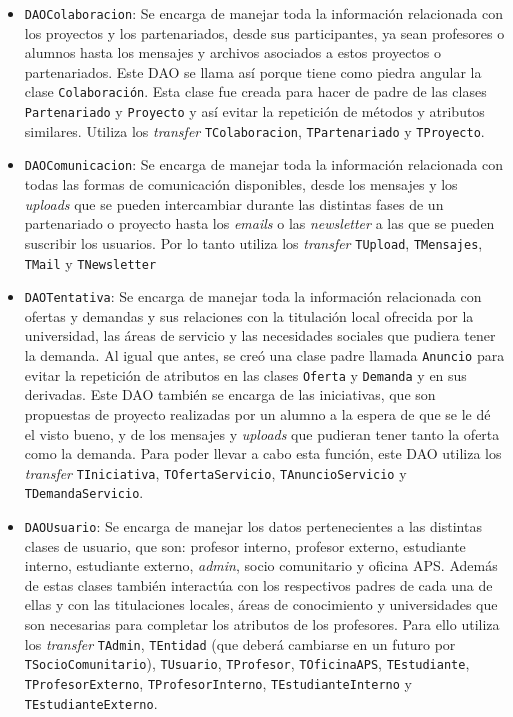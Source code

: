 \documentclass[11pt]{book}
\begin{document}
\begin{itemize}
	\item \texttt{DAOColaboracion}: Se encarga de manejar toda la información relacionada con los proyectos y los partenariados, desde sus participantes, ya sean profesores o alumnos hasta los mensajes y archivos asociados a estos proyectos o partenariados. Este DAO se llama así porque tiene como piedra angular la clase \texttt{Colaboración}.
	Esta clase fue creada para hacer de padre de las clases \texttt{Partenariado} y \texttt{Proyecto} y así evitar la repetición de métodos y atributos similares. Utiliza los \emph{transfer} \texttt{TColaboracion}, \texttt{TPartenariado} y \texttt{TProyecto}.

	\item \texttt{DAOComunicacion}: Se encarga de manejar toda la información relacionada con todas las formas de comunicación disponibles, desde los mensajes y los \emph{uploads} que se pueden intercambiar durante las distintas fases de un partenariado o proyecto hasta los \emph{emails} o las \emph{newsletter} a las que se pueden suscribir los usuarios. Por lo tanto utiliza los \emph{transfer} \texttt{TUpload}, \texttt{TMensajes}, \texttt{TMail} y \texttt{TNewsletter}

	\item \texttt{DAOTentativa}: Se encarga de manejar toda la información relacionada con ofertas y demandas y sus relaciones con la titulación local ofrecida por la universidad, las áreas de servicio y las necesidades sociales que pudiera tener la demanda. 
	Al igual que antes, se creó una clase padre llamada \texttt{Anuncio} para evitar la repetición de atributos en las clases \texttt{Oferta} y \texttt{Demanda} y en sus derivadas. Este DAO también se encarga de las iniciativas, que son propuestas de proyecto realizadas por un alumno a la espera de que se le dé el visto bueno, y de los mensajes y \emph{uploads} que pudieran tener tanto la oferta como la demanda. Para poder llevar a cabo esta función, este DAO utiliza los \emph{transfer} \texttt{TIniciativa}, \texttt{TOfertaServicio}, \texttt{TAnuncioServicio} y \texttt{TDemandaServicio}.

	\item \texttt{DAOUsuario}: Se encarga de manejar los datos pertenecientes a las distintas clases de usuario, que son: profesor interno, profesor externo, estudiante interno, estudiante externo, \emph{admin}, socio comunitario y oficina APS.
	Además de estas clases también interactúa con los respectivos padres de cada una de ellas y con las titulaciones locales, áreas de conocimiento y universidades que son necesarias para completar los atributos de los profesores.
	Para ello utiliza los \emph{transfer} \texttt{TAdmin}, \texttt{TEntidad} (que deberá cambiarse en un futuro por \texttt{TSocioComunitario}), \texttt{TUsuario}, \texttt{TProfesor}, \texttt{TOficinaAPS}, \texttt{TEstudiante}, \texttt{TProfesorExterno}, \texttt{TProfesorInterno}, \texttt{TEstudianteInterno} y \texttt{TEstudianteExterno}.

	
	\end{itemize}
\end{document}
